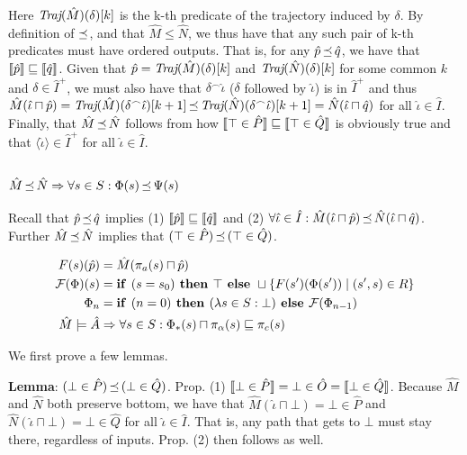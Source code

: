 \noindent Here $\textit{Traj}(\hat M)(\delta)[k]$ is the k-th predicate of the trajectory induced by $\delta$. By definition of $\operatorname{\mathrel{\preceq}}$, and that $\hat M \leq \hat N$, we thus have that any such pair of k-th predicates must have ordered outputs. That is, for any $\hat p \operatorname{\mathrel{\preceq}} \hat q$, we have that $\llbracket\hat p\rrbracket \sqsubseteq \llbracket\hat q\rrbracket$. Given that $\hat p = \textit{Traj}(\hat M)(\delta)[k]$ and $\textit{Traj}(\hat N)(\delta)[k]$ for some common $k$ and $\delta \in \hat I^{+}$, we must also have that $\delta^{\frown}\hat \iota$ ($\delta$ followed by $\hat \iota$) is in $\hat I^{+}$ and thus $\hat M(\hat \iota \sqcap \hat p) = \textit{Traj}(\hat M)(\delta^{\frown}\hat \iota)[k+1] \operatorname{\mathrel{\preceq}} \textit{Traj}(\hat N)(\delta^{\frown}\hat \iota)[k+1] = \hat N(\hat \iota \sqcap \hat q)$ for all $\hat \iota \in \hat I$. Finally, that $\hat M \operatorname{\mathrel{\preceq}} \hat N$ follows from how $\llbracket\top \in \hat P\rrbracket \sqsubseteq \llbracket\top \in \hat Q\rrbracket$ is obviously true and that $\langle \hat \iota \rangle \in \hat I^{+}$ for all $\hat \iota \in \hat I$.

\subsection{$\hat M \operatorname{\mathrel{\preceq}} \hat N \Rightarrow \forall s \in S : \Phi(s) \operatorname{\mathrel{\preceq}} \Psi(s)$}

Recall that $\hat p \operatorname{\mathrel{\preceq}} \hat q$ implies (1) $\llbracket\hat p\rrbracket \sqsubseteq \llbracket\hat q\rrbracket$ and (2) $\forall \hat \iota \in \hat I : \hat M(\hat \iota \sqcap \hat p) \operatorname{\mathrel{\preceq}} \hat N(\hat \iota \sqcap \hat q)$. Further $\hat M \operatorname{\mathrel{\preceq}} \hat N$ implies that $(\top \in \hat P) \operatorname{\mathrel{\preceq}} \, (\top \in \hat Q)$.

\begin{align*}
F(s)(\hat p) &= \hat M(\pi_{a}(s) \sqcap \hat p) \\
\mathcal{F}(\Phi)(s) &= \textrm{\textbf{if }} (s = s_{0}) \textrm{\textbf{ then }} \top \textrm{\textbf{ else }} \sqcup \{ F(s')(\Phi(s')) \mid (s',s) \in R \} \\
\Phi_{n} &= \textrm{\textbf{if }} (n = 0) \textrm{\textbf{ then }} (\lambda s \in S : \bot) \textrm{\textbf{ else }} \mathcal{F}(\Phi_{n-1}) \\
\hat M \models \hat A &\Rightarrow \forall s \in S : \Phi_{*}(s) \sqcap \pi_{\alpha}(s) \sqsubseteq \pi_{c}(s)
\end{align*}

We first prove a few lemmas.

\textbf{Lemma}: $(\bot \in \hat P) \operatorname{\mathrel{\preceq}} \, (\bot \in \hat Q)$. Prop. (1) $\llbracket\bot \in \hat P\rrbracket = \bot \in \hat O = \llbracket\bot \in \hat Q\rrbracket$. Because $\hat M$ and $\hat N$ both preserve bottom, we have that $\hat M(\hat \iota \sqcap \bot) = \bot \in \hat P$ and $\hat N(\hat \iota \sqcap \bot) = \bot \in \hat Q$ for all $\hat \iota \in \hat I$. That is, any path that gets to $\bot$ must stay there, regardless of inputs. Prop. (2) then follows as well.

